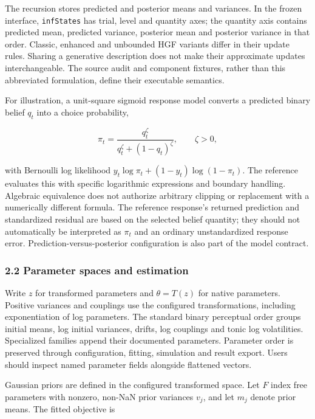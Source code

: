 \documentclass[
  11pt,
]{article}
\begin{document}
The recursion stores predicted and posterior means and variances. In the
frozen interface, \texttt{infStates} has trial, level and quantity axes;
the quantity axis contains predicted mean, predicted variance, posterior
mean and posterior variance in that order. Classic, enhanced and
unbounded HGF variants differ in their update rules. Sharing a
generative description does not make their approximate updates
interchangeable. The source audit and component fixtures, rather than
this abbreviated formulation, define their executable semantics.

For illustration, a unit-square sigmoid response model converts a
predicted binary belief \(q_t\) into a choice probability,

\[
\pi_t=\frac{q_t^{\zeta}}{q_t^{\zeta}+(1-q_t)^{\zeta}},\qquad \zeta>0,
\]

with Bernoulli log likelihood \(y_t\log\pi_t+(1-y_t)\log(1-\pi_t)\). The
reference evaluates this with specific logarithmic expressions and
boundary handling. Algebraic equivalence does not authorize arbitrary
clipping or replacement with a numerically different formula. The
reference response's returned prediction and standardized residual are
based on the selected belief quantity; they should not automatically be
interpreted as \(\pi_t\) and an ordinary unstandardized response error.
Prediction-versus-posterior configuration is also part of the model
contract.

\subsubsection{2.2 Parameter spaces and
estimation}\label{parameter-spaces-and-estimation}

Write \(z\) for transformed parameters and \(\theta=T(z)\) for native
parameters. Positive variances and couplings use the configured
transformations, including exponentiation of log parameters. The
standard binary perceptual order groups initial means, log initial
variances, drifts, log couplings and tonic log volatilities. Specialized
families append their documented parameters. Parameter order is
preserved through configuration, fitting, simulation and result export.
Users should inspect named parameter fields alongside flattened vectors.

Gaussian priors are defined in the configured transformed space. Let
\(F\) index free parameters with nonzero, non-NaN prior variances
\(v_j\), and let \(m_j\) denote prior means. The fitted objective is
\end{document}
